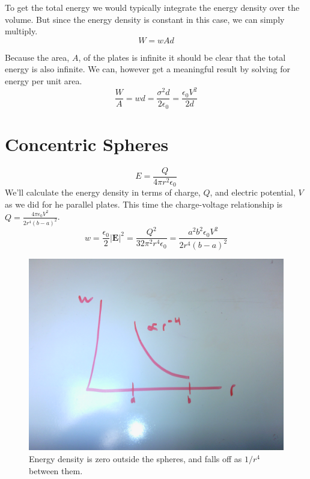\documentclass[10pt,a4paper]{article}
\begin{document}
To get the total energy we would typically integrate the energy density over the volume. But since the energy density is constant in this case, we can simply multiply.
\begin{equation}
W=wAd
\end{equation}

Because the area, $A$, of the plates is infinite it should be clear that the total energy is also infinite. We can, however get a meaningful result by solving for energy per unit area.
\begin{equation}
\frac{W}{A}=wd=\frac{\sigma^2d}{2\epsilon_0}=\frac{\epsilon_0 V^2}{2d}
\end{equation}

\section{Concentric Spheres}
\begin{equation}
E=\frac{Q}{4\pi r^2\epsilon_0}
\end{equation}
We'll calculate the energy density in terms of charge, $Q$, and electric potential, $V$ as we did for he parallel plates. This time the charge-voltage relationship is $Q=\frac{4\pi\epsilon_0 V^2}{2r^4(b-a)^2}$.
\begin{equation}
w=\frac{\epsilon_0}{2}|\mathbf{E}|^2=\frac{Q^2}{32\pi^2r^4\epsilon_0}=\frac{a^2b^2\epsilon_0V^2}{2r^4(b-a)^2}\label{w-sphere}
\end{equation}

\begin{figure}[h]
\centering
\includegraphics[scale=.1]{Jackson1-8-sphere.jpg}
\caption{Energy density is zero outside the spheres, and falls off as $1/r^4$ between them.}
\end{figure}
\end{document}
